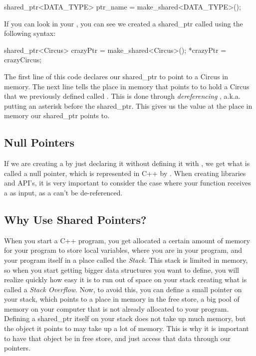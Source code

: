 \documentclass{tufte-handout}
\begin{document}
\begin{Code}
shared_ptr<DATA_TYPE> ptr_name = make_shared<DATA_TYPE>();
\end{Code}

\noindent
If you can look in your , you can see we created a shared\_ptr  called  using the following syntax:

\begin{Code}
shared_ptr<Circus> crazyPtr = make_shared<Circus>();
*crazyPtr = crazyCircus;
\end{Code}

\noindent
The first line of this code declares our shared\_ptr to point to a Circus in memory. 
The next line tells the place in memory that   points to to hold a Circus that we previously defined called .  
This is done through \textit{dereferencing} , a.k.a. putting an asterisk before the shared\_ptr.  
This gives us the value at the place in memory our shared\_ptr points to.

\subsection{Null Pointers}

If we are creating a  by just declaring it without defining it with , we get what is called a null pointer, which is represented in C++ by .
When creating libraries and API's, it is very important to consider the case where your function receives a  as input, as a  can't be de-referenced.

\subsection{Why Use Shared Pointers?}
When you start a C++ program, you get allocated a certain amount of memory for your program to store local variables, where you are in your program, and your program itself in a place called the \textit{Stack}.
This stack is limited in memory, so when you start getting bigger data structures you want to define, you will realize quickly how easy it is to run out of space on your stack creating what is called a \textit{Stack Overflow}.
Now, to avoid this, you can define a small pointer on your stack, which points to a place in memory in the free store, a big pool of memory on your computer that is not already allocated to your program.
Defining a shared\_ptr itself on your stack does not take up much memory, but the object it points to may take up a lot of memory.  
This is why it is important to have that object be in free store, and just access that data through our pointers.
\end{document}
